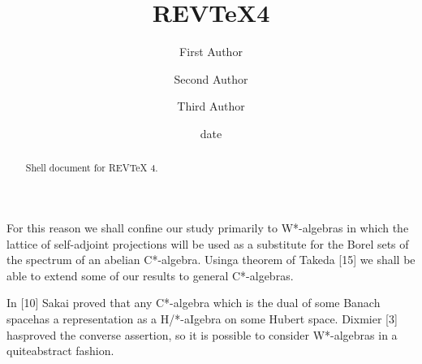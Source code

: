 \documentclass[aps,preprint]{revtex4}
\begin{document}
\title[Short title for running header]{REV\TeX4}
\author{First Author}
\author{Second Author}
\author{Third Author}

\begin{abstract}
Shell document for REV\TeX{} 4.
\end{abstract}

\date[Date text]{date}
\maketitle
\tableofcontents

For this reason we shall confine our study primarily to W*-algebras in which
the lattice of self-adjoint projections will be used as a substitute for the
Borel sets of the spectrum of an abelian C*-algebra. Usinga theorem of
Takeda [15] we shall be able to extend some of our results to general
C*-algebras.

In [10] Sakai proved that any C*-algebra which is the dual of some Banach
spacehas a representation as a H/*-aIgebra on some Hubert space. Dixmier [3]
hasproved the converse assertion, so it is possible to consider W*-algebras
in a quiteabstract fashion. 
\end{document}

